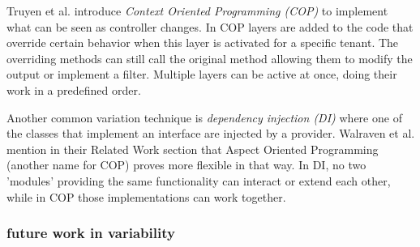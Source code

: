 Truyen et al. \cite{truyen2012context} introduce \textit{Context Oriented Programming (COP)} to implement what can be seen as controller changes. 
In COP layers are added to the code that override certain behavior when this layer is activated for a specific tenant. 
The overriding methods can still call the original method allowing them to modify the output or implement a filter. 
Multiple layers can be active at once, doing their work in a predefined order. 

Another common variation technique is \textit{dependency injection (DI)} \cite{walraven2011middleware} where one of the classes that implement an interface are injected by a provider. 
Walraven et al. mention in their Related Work section that Aspect Oriented Programming (another name for COP) proves more flexible in that way. 
In DI, no two 'modules' providing the same functionality can interact or extend each other, while in COP those implementations can work together. 

\subsubsection{future work in variability}

